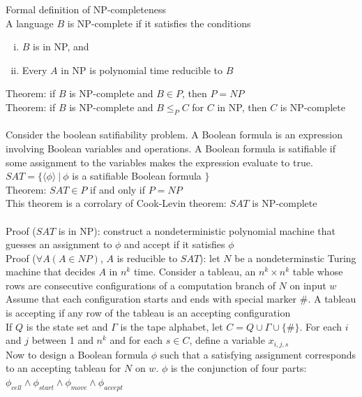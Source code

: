\documentclass{article}
\newcommand*{\<}{\langle}
\renewcommand*{\>}{\rangle}
\begin{document}
			Formal definition of NP-completeness \\
			A language $B$ is NP-complete if it satisfies the conditions
			\begin{enumerate}[(i)]
				\item $B$ is in NP, and
				\item Every $A$ in NP is polynomial time reducible to $B$
				\end{enumerate}
			Theorem: if $B$ is NP-complete and $B \in P$, then $P = NP$ \\
			Theorem: if $B$ is NP-complete and $B \leq_P C$ for $C$ in NP, then $C$ is NP-complete \\
			\\
			Consider the boolean satifiability problem. A Boolean formula is an expression involving Boolean variables and operations. A Boolean formula is satifiable if some assignment to the variables makes the expression evaluate to true. \\
			$SAT = \{\<\phi\>\:|\:\phi$ is a satifiable Boolean formula $\}$ \\
			Theorem: $SAT \in P$ if and only if $P = NP$ \\
			This theorem is a corrolary of Cook-Levin theorem: $SAT$ is NP-complete \\
			\\
			Proof ($SAT$ is in NP): construct a nondeterministic polynomial machine that guesses an assignment to $\phi$ and accept if it satisfies $\phi$ \\
			Proof ($\forall A(A \in NP)$, $A$ is reducible to $SAT$): let $N$ be a nondeterminstic Turing machine that decides $A$ in $n^k$ time. Consider a tableau, an $n^k \times n^k$ table whose rows are consecutive configurations of a computation branch of $N$ on input $w$ \\
			Assume that each configuration starts and ends with special marker $\#$. A tableau is accepting if any row of the tableau is an accepting configuration \\
			If $Q$ is the state set and $\Gamma$ is the tape alphabet, let $C = Q \cup \Gamma \cup \{\#\}$. For each $i$ and $j$ between 1 and $n^k$ and for each $s \in C$, define a variable $x_{i, j, s}$ \\
			Now to design a Boolean formula $\phi$ such that a satisfying assignment corresponds to an accepting tableau for $N$ on $w$. $\phi$ is the conjunction of four parts: $\phi_{cell} \land \phi_{start} \land \phi_{move} \land \phi_{accept}$ 
\end{document}
